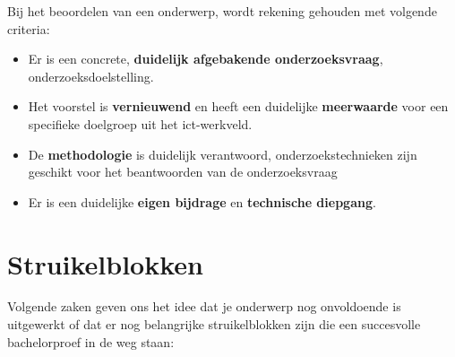 Bij het beoordelen van een onderwerp, wordt rekening gehouden met volgende criteria:

\begin{itemize}
  \item Er is een concrete, \textbf{duidelijk afgebakende onderzoeksvraag}, onderzoeksdoelstelling.
  \item Het voorstel is \textbf{vernieuwend} en heeft een duidelijke \textbf{meerwaarde} voor een specifieke doelgroep uit het ict-werkveld.
  \item De \textbf{methodologie} is duidelijk verantwoord, onderzoekstechnieken zijn ge\-schikt voor het beantwoorden van de onderzoeksvraag
  \item Er is een duidelijke \textbf{eigen bijdrage} en \textbf{technische diepgang}.
\end{itemize}

\section{Struikelblokken}%
\label{sec:onderwerp-struikelblokken}

Volgende zaken geven ons het idee dat je onderwerp nog onvoldoende is uitgewerkt of dat er nog belangrijke struikelblokken zijn die een succesvolle bachelorproef in de weg staan:


